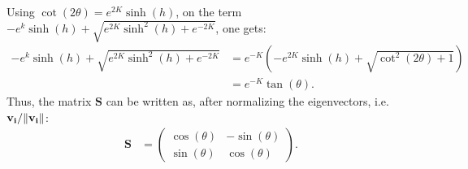 \documentclass[a4paper]{article}
\begin{document}
Using $\cot(2\theta) = e^{2K}\sinh(h)$, on the term $-e^{k}\sinh(h) + \sqrt{e^{2K}\sinh^2(h) + e^{-2K}}$, one gets:
\begin{align*}
    -e^{k}\sinh(h) + \sqrt{e^{2K}\sinh^2(h) + e^{-2K}} &= e^{-K}\left(-e^{2K}\sinh(h) + \sqrt{\cot^2(2\theta) + 1}\right)\\
    &=e^{-K}\tan(\theta).
\end{align*}Thus, the matrix $\mathbf{S}$ can be written as, after normalizing the eigenvectors, i.e. $\mathbf{v_{i}}/\norm{\mathbf{v_{i}}}$:
\begin{align*}
    \mathbf{S} &=\begin{pmatrix}
        \cos(\theta) & -\sin(\theta)\\
        \sin(\theta) &\cos(\theta)
    \end{pmatrix}.
\end{align*}
\end{document}
